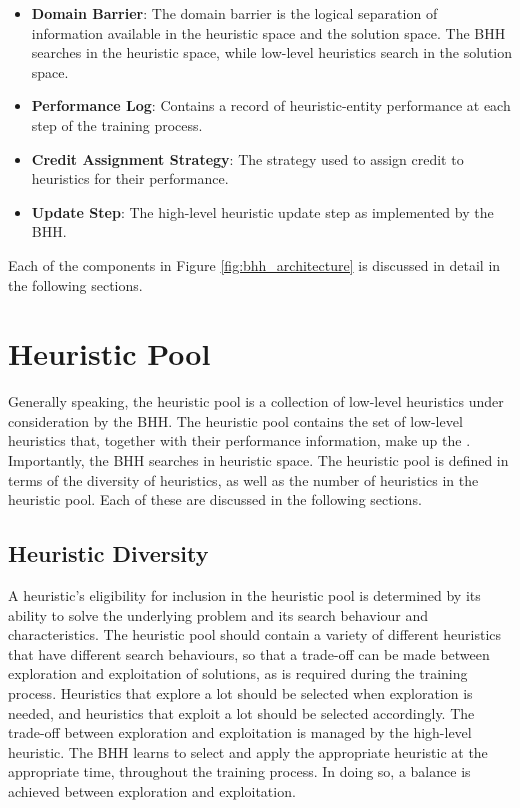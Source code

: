 \begin{itemize}
      \item \textbf{Domain Barrier}: The domain barrier is the logical separation of information available in the heuristic space and the solution space. The \acs{BHH} searches in the heuristic space, while low-level heuristics search in the solution space.

      \item \textbf{Performance Log}: Contains a record of heuristic-entity performance at each step of the training process.

      \item \textbf{Credit Assignment Strategy}: The strategy used to assign credit to heuristics for their performance.

      \item \textbf{Update Step}: The high-level heuristic update step as implemented by the \acs{BHH}.
\end{itemize}

Each of the components in Figure \ref{fig:bhh_architecture} is discussed in detail in the following sections.

\section{Heuristic Pool}\label{sec:bhh:heuristic_pool}

Generally speaking, the heuristic pool is a collection of low-level heuristics under consideration by the \acs{BHH}. The heuristic pool contains the set of low-level heuristics that, together with their performance information, make up the . Importantly, the \acs{BHH} searches in heuristic space. The heuristic pool is defined in terms of the diversity of heuristics, as well as the number of heuristics in the heuristic pool. Each of these are discussed in the following sections.

\subsection{Heuristic Diversity}\label{sec:bhh:heuristic_pool:diversity}

A heuristic's eligibility for inclusion in the heuristic pool is determined by its ability to solve the underlying problem and its search behaviour and characteristics. The heuristic pool should contain a variety of different heuristics that have different search behaviours, so that a trade-off can be made between exploration and exploitation of solutions, as is required during the training process. Heuristics that explore a lot should be selected when exploration is needed, and heuristics that exploit a lot should be selected accordingly. The trade-off between exploration and exploitation is managed by the high-level heuristic. The \acs{BHH} learns to select and apply the appropriate heuristic at the appropriate time, throughout the training process. In doing so, a balance is achieved between exploration and exploitation.

